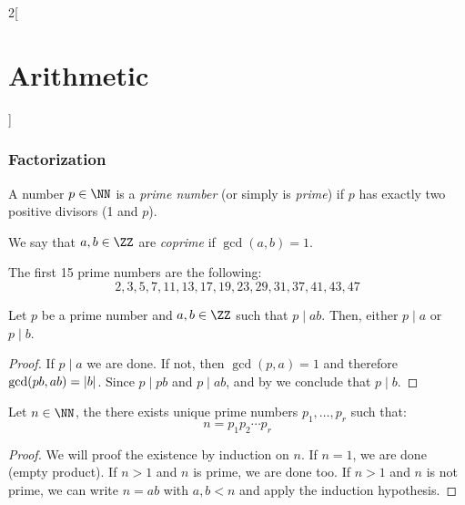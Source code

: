 \documentclass[../../../main_math.tex]{subfiles}
\begin{document}
\begin{multicols}{2}[\section{Arithmetic}]
  \subsubsection{Factorization}
  \begin{definition}
    A number $p\in\NN$ is a \emph{prime number} (or simply is \emph{prime}) if $p$ has exactly two positive divisors (1 and $p$).
  \end{definition}
  \begin{definition}
    We say that $a,b\in\ZZ$ are \emph{coprime} if $\gcd(a,b)=1$.
  \end{definition}
  \begin{remark}
    The first 15 prime numbers are the following: $$2, 3, 5, 7, 11, 13, 17, 19, 23, 29, 31, 37, 41, 43, 47$$
  \end{remark}
  \begin{theorem}
    Let $p$ be a prime number and $a,b\in \ZZ$ such that $p\mid ab$. Then, either $p\mid a$ or $p\mid b$.
  \end{theorem}
  \begin{proof}
    If $p\mid a$ we are done. If not, then $\gcd(p,a)=1$ and therefore $\gcd(pb,ab)=\abs{b}$. Since $p\mid pb$ and $p\mid ab$, and by  we conclude that $p\mid b$.
  \end{proof}
  \begin{theorem}\label{A:fundamentalthm}
    Let $n\in\NN$, the there exists unique prime numbers $p_1,\ldots, p_r$ such that: $$n=p_1p_2\cdots p_r$$
  \end{theorem}
  \begin{proof}
    We will proof the existence by induction on $n$. If $n=1$, we are done (empty product). If $n>1$ and $n$ is prime, we are done too. If $n>1$ and $n$ is not prime, we can write $n=ab$ with $a,b<n$ and apply the induction hypothesis.


\end{proof}
\end{multicols}
\end{document}
